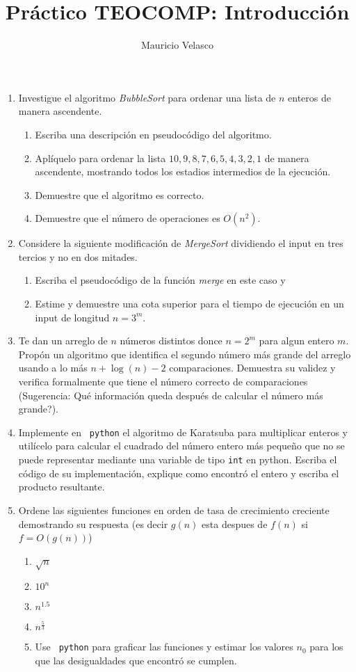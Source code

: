\documentclass[12pt, a4paper]{article}
\date{}
\begin{document}
\title{Pr\'actico TEOCOMP: Introducción}
\author{Mauricio Velasco}
\maketitle
\begin{enumerate}
\item Investigue el algoritmo \emph{BubbleSort} para ordenar una lista de $n$ enteros de manera ascendente.
\begin{enumerate}
\item Escriba una descripción en pseudocódigo del algoritmo.
\item Aplíquelo para ordenar la lista $10,9,8,7,6,5,4,3,2,1$ de manera ascendente, mostrando todos los estadios intermedios de la ejecución.
\item Demuestre que el algoritmo es correcto.
\item Demuestre que el número de operaciones es $O(n^2)$.
\end{enumerate}

\item Considere la siguiente modificación de \emph{MergeSort} dividiendo el input en tres tercios y no en dos mitades.
\begin{enumerate}
\item Escriba el pseudocódigo de la función \emph{merge} en este caso y
\item Estime y demuestre una cota superior para el tiempo de ejecución en un input de longitud $n=3^m$.
\end{enumerate}

\item Te dan un arreglo de $n$ números distintos donce $n=2^m$ para algun entero $m$. Propón un algoritmo que identifica el segundo número más grande del arreglo usando a lo más $n+\log(n)-2$ comparaciones. Demuestra su validez y verifica formalmente que tiene el número correcto de comparaciones (Sugerencia: Qué información queda después de calcular el número más grande?).

\item Implemente en \verb! python! el algoritmo de Karatsuba para multiplicar enteros y utilícelo para calcular el cuadrado del número entero más pequeño que no se puede representar mediante una variable de tipo \verb!int! en python. Escriba el código de su implementación, explique como encontró el entero y escriba el producto resultante.

\item Ordene las siguientes funciones en orden de tasa de crecimiento creciente demostrando su respuesta (es decir $g(n)$ esta despues de $f(n)$ si $f=O(g(n))$) 
\begin{enumerate}
\item $\sqrt{n}$
\item $10^n$
\item $n^{1.5}$
\item $n^{\frac{5}{3}}$
\item Use \verb! python! para graficar las funciones y estimar los valores $n_0$ para los que las desigualdades que encontró se cumplen. 
\end{enumerate}



\end{enumerate}
\end{document}
